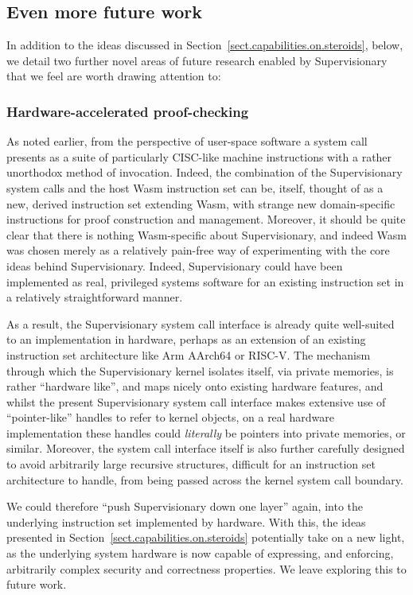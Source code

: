\documentclass[a4paper, UKenglish, cleveref, autoref, thm-restate, colorlinks]{lipics-v2021}
\begin{document}
\subsection{Even more future work}
\label{subsect.future.work}

In addition to the ideas discussed in Section~\ref{sect.capabilities.on.steroids}, below, we detail two further novel areas of future research enabled by Supervisionary that we feel are worth drawing attention to:

\subsubsection*{Hardware-accelerated proof-checking}

As noted earlier, from the perspective of user-space software a system call presents as a suite of particularly CISC-like machine instructions with a rather unorthodox method of invocation.
Indeed, the combination of the Supervisionary system calls and the host Wasm instruction set can be, itself, thought of as a new, derived instruction set extending Wasm, with strange new domain-specific instructions for proof construction and management.
Moreover, it should be quite clear that there is nothing Wasm-specific about Supervisionary, and indeed Wasm was chosen merely as a relatively pain-free way of experimenting with the core ideas behind Supervisionary.
Indeed, Supervisionary could have been implemented as real, privileged systems software for an existing instruction set in a relatively straightforward manner.

As a result, the Supervisionary system call interface is already quite well-suited to an implementation in hardware, perhaps as an extension of an existing instruction set architecture like Arm AArch64 or RISC-V.
The mechanism through which the Supervisionary kernel isolates itself, via private memories, is rather ``hardware like'', and maps nicely onto existing hardware features, and whilst the present Supervisionary system call interface makes extensive use of ``pointer-like'' handles to refer to kernel objects, on a real hardware implementation these handles could \emph{literally} be pointers into private memories, or similar.
Moreover, the system call interface itself is also further carefully designed to avoid arbitrarily large recursive structures, difficult for an instruction set architecture to handle, from being passed across the kernel system call boundary.

We could therefore ``push Supervisionary down one layer'' again, into the underlying instruction set implemented by hardware.
With this, the ideas presented in Section~\ref{sect.capabilities.on.steroids} potentially take on a new light, as the underlying system hardware is now capable of expressing, and enforcing, arbitrarily complex security and correctness properties.
We leave exploring this to future work.
\end{document}
